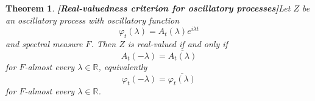 \documentclass{article}
\newcommand{\tmstrong}[1]{\textbf{#1}}
\newtheorem{theorem}{Theorem}
\begin{document}
\begin{theorem}
  {\tmstrong{[Real-valuedness criterion for oscillatory
  processes]\label{thm:realvaluedness}}}Let $Z$ be an oscillatory process with
  oscillatory function
  \begin{equation}
    \varphi_t (\lambda) = A_t (\lambda) e^{i \lambda t}
  \end{equation}
  and spectral measure $F$. Then $Z$ is real-valued if and only if
  \begin{equation}
    A_t  (- \lambda) = \overline{A_t (\lambda)}
  \end{equation}
  for $F$-almost every $\lambda \in \mathbb{R}$, equivalently
  \begin{equation}
    \varphi_t  (- \lambda) = \overline{\varphi_t (\lambda)}
  \end{equation}
  for $F$-almost every $\lambda \in \mathbb{R}$.
\end{theorem}
\end{document}
